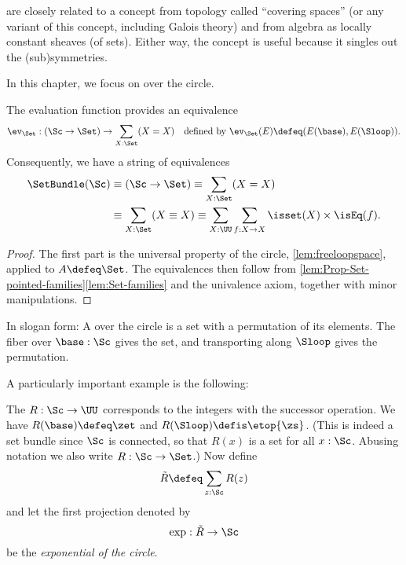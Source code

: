 \begin{remark}
  \Coverings are closely related to a concept from topology called ``covering spaces''
(or any variant of this concept, including Galois theory) and from algebra as locally constant sheaves (of sets).
Either way, the concept is useful because it singles out the (sub)symmetries.
\end{remark}

In this chapter, we focus on \coverings over the circle.

\begin{theorem}\label{thm:coveringsofS1perms}
  The evaluation function provides an equivalence
  \[
    \ev_\Set : (\Sc \to \Set) \to \sum_{X:\Set}(X=X)
    \quad\text{defined by $\ev_\Set(E) \defeq (E(\base),E(\Sloop))$.}
  \]
  Consequently, we have a string of equivalences
  \begin{align*}
    \SetBundle(\Sc)
    &\equiv (\Sc \to \Set)
      \equiv \sum_{X:\Set}(X=X) \\
    &\equiv \sum_{X:\Set}(X\equiv X)
    \equiv \sum_{X:\UU}\sum_{f:X\to X}
    \isset(X) \times \isEq(f).
  \end{align*}
\end{theorem}
\begin{proof}
  The first part is the universal property of the circle,
  \cref{lem:freeloopspace}, applied to $A\defeq\Set$.
  The equivalences then follow from \cref{lem:Prop-Set-pointed-families}\ref{lem:Set-families} and the univalence axiom,
  together with minor manipulations.
\end{proof}
In slogan form: A \covering over the circle is a set with a permutation of its elements.
The fiber over $\base:\Sc$ gives the set,
and transporting along $\Sloop$ gives the permutation.

A particularly important example is the following:
\begin{definition}\label{def:RtoS1}
  The \covering $R:\Sc\to\UU$ corresponds to the integers with the successor operation.
  We have $R(\base)\defeq\zet$ and $R(\Sloop)\defis \etop{\zs}$.
  (This is indeed a set bundle since $\Sc$ is connected,
  so that $R(x)$ is a set for all $x:\Sc$.
  Abusing notation we also write $R:\Sc\to\Set$.)
  Now define
  \[
    \tilde R\defeq\sum_{z:\Sc}R(z)
  \]
  and let the first projection denoted by
  \[
    \exp:\tilde R \to \Sc
  \]
  be the \emph{exponential \covering of the circle}.
\end{definition}

